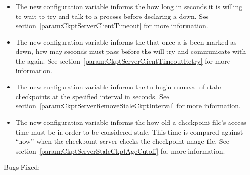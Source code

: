 \begin{itemize}

\item The new configuration variable 
informs the  how long in seconds it is willing to wait
to try and talk to a  process before declaring a
 down.
See section~\ref{param:CkptServerClientTimeout} for more information.

\item The new configuration variable
 informs the 
that once a  is been marked as down, how may seconds
must pass before the  will try and communicate with the
 again.
See section~\ref{param:CkptServerClientTimeoutRetry} for more information.

\item The new configuration variable
 informs the
 to begin removal of stale checkpoints at the specified
interval in seconds.
See section~\ref{param:CkptServerRemoveStaleCkptInterval} for more information.

\item The new configuration variable
 informs the
 how old a checkpoint file's access time must be
in order to be considered stale. This time is compared against ``now''
when the checkpoint server checks the checkpoint image file.
See section~\ref{param:CkptServerStaleCkptAgeCutoff} for more information.

\end{itemize}

\noindent Bugs Fixed:

